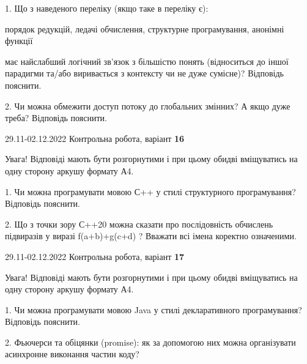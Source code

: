 \documentclass[11pt, ukrainian]{article}
\begin{document}
{
\begin {large}

1. Що з наведеного переліку (якщо таке в переліку є):

\vspace{4mm}
 порядок редукцій, ледачі обчислення, структурне програмування, анонімні функції

\vspace{4mm}
має найслабший логічний зв’язок з більшістю понять (відноситься до іншої парадигми та/або виривається з контексту чи не дуже сумісне)? Відповідь пояснити.


2. Чи можна обмежити доступ потоку до глобальних змінних? А якщо дуже треба? Відповідь пояснити.

\end {large}}

\vspace{4mm}



{29.11-02.12.2022 Контрольна робота, варіант  \No \textbf { 16 }\par}
Увага! Відповіді мають бути розгорнутими і при цьому обидві вміщуватись на одну сторону аркушу формату А4.

{
\begin {large}

1. Чи можна програмувати мовою С++ у стилі структурного програмування? Відповідь пояснити.%

2. Що з точки зору С++20 можна сказати про послідовність обчислень підвиразів у виразі f(a+b)+g(c+d) ? Вважати всі імена коректно означеними.

\end {large}}

\vspace{4mm}
\newpage
{29.11-02.12.2022 Контрольна робота, варіант  \No \textbf { 17 }\par}
Увага! Відповіді мають бути розгорнутими і при цьому обидві вміщуватись на одну сторону аркушу формату А4.

{
\begin {large}

1. Чи можна програмувати мовою Java у стилі декларативного програмування? Відповідь пояснити.%

2. Фьючерси та обіцянки (promise): як за допомогою них можна організувати асинхронне виконання частин коду?

\end {large}}
\end{document}
